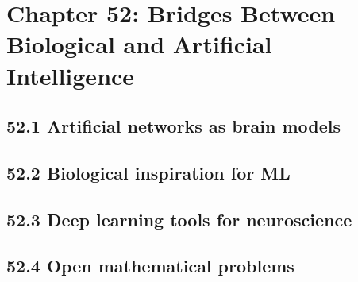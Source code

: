 \section{Chapter 52: Bridges Between Biological and Artificial Intelligence}

\subsection{52.1 Artificial networks as brain models}

\subsection{52.2 Biological inspiration for ML}

\subsection{52.3 Deep learning tools for neuroscience}

\subsection{52.4 Open mathematical problems}

\clearpage
